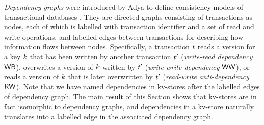 \emph{Dependency graphs} were introduced by Adya to define consistency models of transactional databases \cite{adya}. 
They are directed graphs consisting of transactions as nodes, 
each of which is labelled with transaction identifier and a set of read and write operations,
and labelled edges between transactions for describing how information flows between nodes. 
Specifically, a transaction $t$ reads a version for a key $k$ that has been written by another transaction $t'$ 
(\emph{write-read dependency} \( \mathsf{WR}\)), overwrites a version of $k$ written by $t'$ (\emph{write-write dependency} \( \mathsf{WW} \)),
or reads a version of $k$ that is later overwritten by $t'$ (\emph{read-write anti-dependency} \( \mathsf{RW} \)). 
Note that we have named dependencies in kv-stores after the labelled edges of dependency graph. 
The main result of this Section shows that kv-stores are in fact isomorphic to dependency graphs, 
and dependencies in a kv-store naturally translates into a labelled edge in the associated dependency graph.

